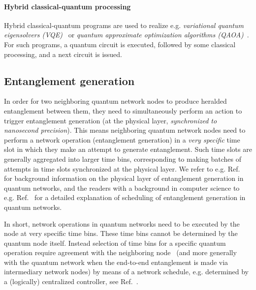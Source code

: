 \paragraph{Hybrid classical-quantum processing}
Hybrid classical-quantum programs are used to realize e.g. \textit{variational quantum eigensolvers (VQE)}~\cite{diadamo2021distributed, liu2022layer} or \textit{quantum approximate optimization algorithms (QAOA)}~\cite{farhi2014quantum}.
For such programs, a quantum circuit is executed, followed by some classical processing, and a next circuit is issued.

\subsection{Entanglement generation}
In order for two neighboring quantum network nodes to produce heralded entanglement between them, they need to simultaneously perform an action to trigger entanglement generation (at the physical layer, \emph{synchronized to nanosecond precision}).
This means neighboring quantum network nodes need to perform a network operation (entanglement generation) in a \emph{very specific} time slot in which they make an attempt to generate entanglement.
Such time slots are generally aggregated into larger time bins, corresponding to making batches of attempts in time slots synchronized at the physical layer.
We refer to e.g. Ref.~\cite{pompili_2022_experimental} for background information on the physical layer of entanglement generation in quantum networks, and the readers with a background in computer science to e.g. Ref.~\cite{dahlberg_2019_egp} for a detailed explanation of scheduling of entanglement generation in quantum networks.

In short, network operations in quantum networks need to be executed by the node at very specific time bins.
These time bins cannot be determined by the quantum node itself.
Instead selection of time bins for a specific quantum operation require agreement with the neighboring node~\cite{dahlberg_2019_egp} (and more generally with the quantum network when the end-to-end entanglement is made via intermediary network nodes) by means of a network schedule, e.g. determined by a (logically) centralized controller, see Ref.~\cite{skrzypczyk_2021_arch}.


